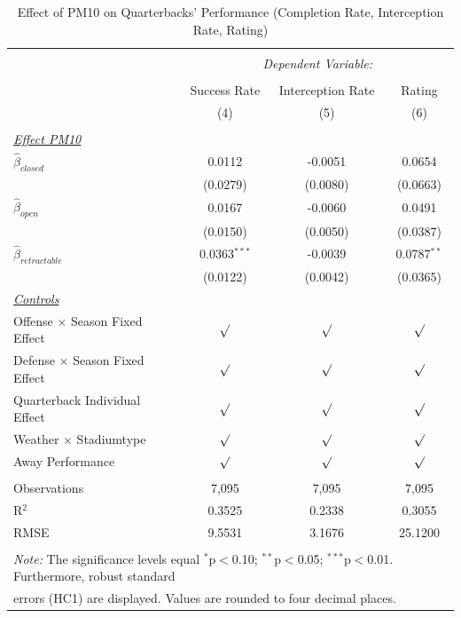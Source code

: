 \documentclass[12pt,a4paper]{article}
\begin{document}
{\begin{table}[!htbp] \centering 
 \caption{Effect of PM10 on Quarterbacks' Performance (Completion Rate, Interception Rate, Rating)} 
 \label{T1} 
\begin{tabular}{@{\extracolsep{5pt}}lccc} 
\\[-1.8ex]\hline 
\hline \\[-1.8ex] 
 & \multicolumn{3}{c}{\textit{Dependent Variable:}} \\ \cline{2-4} \\ [-1.8ex]
 & Success Rate & Interception Rate & Rating \\ 
 & (4) & (5) & (6)\\ \hline \\[-1.8ex] 
 \underline{\textit{Effect PM10}}\\[0.4cm]
 $\hat{\beta}_{closed}$& 0.0112 & -0.0051 & 0.0654 \\ 
 & (0.0279) & (0.0080)& (0.0663) \\[0.4cm]
 $\hat{\beta}_{open}$& 0.0167 & -0.0060 & 0.0491\\ 
 & (0.0150) & (0.0050) & (0.0387) \\[0.4cm]
 $\hat{\beta}_{retractable}$& 0.0363$^{***}$ & -0.0039 & 0.0787$^{**}$\\ 
 & (0.0122) & (0.0042) & (0.0365)\\ [0.4cm]
 \underline{\textit{Controls}} \\[0.4cm]
 Offense $\times$ Season Fixed Effect & $\surd$ & $\surd$ & $\surd$ \\[0.4cm]
 Defense $\times$ Season Fixed Effect & $\surd$ & $\surd$ & $\surd$ \\[0.4cm]
 Quarterback Individual Effect & $\surd$ & $\surd$ & $\surd$ \\[0.4cm]
 Weather $\times $ Stadiumtype & $\surd$ & $\surd$ & $\surd$ \\[0.4cm]
 Away Performance & $\surd$ & $\surd$ & $\surd$\\
\hline \\[-1.8ex] 
Observations & 7,095 & 7,095 & 7,095 \\ 
R$^{2}$ & 0.3525 & 0.2338 & 0.3055 \\ 
RMSE & 9.5531 & 3.1676 & 25.1200 \\ \hline 
\hline \\[-1.8ex] 
\multicolumn{4}{l}{\footnotesize \textit{Note:} The significance levels equal {$^{*}$p$<$0.10; $^{**}$p$<$0.05; $^{***}$p$<$0.01}. Furthermore, robust standard} \\ \multicolumn{4}{l}{\footnotesize errors (HC1) are displayed. Values are rounded to four decimal places.}

\end{tabular}
\end{table}}
\end{document}
